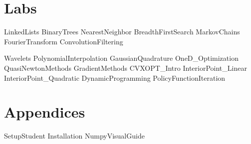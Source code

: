 \documentclass[opener-c,labs,red,nociteref]{HJnewsiambook}
\begin{document}
\part{Labs}
{LinkedLists}
{BinaryTrees}
{NearestNeighbor}
{BreadthFirstSearch}
{MarkovChains}
{FourierTransform}
{ConvolutionFiltering}

{Wavelets}
{PolynomialInterpolation}
{GaussianQuadrature}
{OneD_Optimization}
{QuasiNewtonMethods}
{GradientMethods}
{CVXOPT_Intro}
{InteriorPoint_Linear}
{InteriorPoint_Quadratic}
{DynamicProgramming}
{PolicyFunctionIteration}

\part{Appendices}
\begin{appendices}
{SetupStudent}
{Installation}
{NumpyVisualGuide}
\end{appendices}



\end{document}
